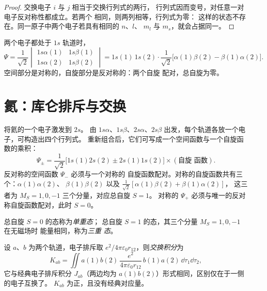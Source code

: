 \begin{proof}
交换电子 $i$ 与 $j$ 相当于交换行列式的两行，
行列式因而变号，对任意一对电子反对称性都成立。若两个
相同，则两列相等，行列式为零：
这样的状态不存在。同一原子中两个电子若具有相同的 $n$、$l$、
$m_l$ 与 $m_s$，就会占据同一。
\end{proof}

\begin{example}[氦的基态]\label{ex:b3:many-electron-atoms:helium-ground}
两个电子都处于 $1s$ 轨道时，
\[
\Psi = \frac{1}{\sqrt2}\begin{vmatrix}1s\alpha(1) & 1s\beta(1)\\ 1s\alpha(2) &
1s\beta(2)\end{vmatrix} = 1s(1)\,1s(2)\cdot\frac{1}{\sqrt2}\big[\alpha(1)\beta(2)
- \beta(1)\alpha(2)\big].
\]
空间部分是对称的，自旋部分是反对称的：两个自旋
配对，总自旋为零。
\end{example}

\section{氦：库仑排斥与交换}

将氦的一个电子激发到 $2s$。
由 $1s\alpha$、$1s\beta$、$2s\alpha$、$2s\beta$ 出发，每个轨道各放一个电子，可构造出四个行列式。
重新组合后，它们可写成一个空间函数与一个自旋函数的乘积：
\[
\Psi_\pm = \frac{1}{\sqrt2}\big[1s(1)2s(2) \pm 2s(1)1s(2)\big]\times(\text{自旋
函数}).
\]
反对称的空间函数 $\Psi_-$ 必须与一个对称的
自旋函数配对。对称的自旋函数共有三个：$\alpha(1)\alpha(2)$、
$\beta(1)\beta(2)$ 以及 $\frac{1}{\sqrt2}[\alpha(1)\beta(2) + \beta(1)\alpha(2)]$，
这三者为 $M_S = 1, 0, -1$ 三个分量，对应总自旋 $S = 1$。
对称的 $\Psi_+$ 必须与唯一的反对称自旋函数配对，此时 $S = 0$。

\begin{definition}[单重态与三重态]\label{def:b3:many-electron-atoms:singlet-triplet}
总自旋 $S = 0$ 的态称为\emph{单重态}；
总自旋 $S = 1$ 的态，其三个分量 $M_S = 1, 0, -1$ 在无磁场时
能量相同，称为\emph{三重
态}。
\end{definition}

\begin{definition}[交换积分]\label{def:b3:many-electron-atoms:exchange}
设 $a$、$b$ 为两个轨道，电子排斥取 $e^2/4\pi\varepsilon_0
r_{12}$，则\emph{交换积分}为
\[
K_{ab} = \iint a(1)b(2)\,\frac{e^2}{4\pi\varepsilon_0r_{12}}\,b(1)a(2)\,\dd\tau_1\dd\tau_2,
\]
它与经典电子排斥积分 $J_{ab}$（两边均为
$a(1)b(2)$）形式相同，区别仅在于一侧的电子互换了。
$K_{ab}$ 为正，且没有经典对应量。
\end{definition}

